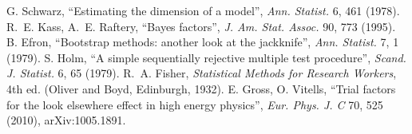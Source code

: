  G. Schwarz, ``Estimating the dimension of a model'', \emph{Ann. Statist.} 6, 461 (1978).
 R.~E. Kass, A.~E. Raftery, ``Bayes factors'', \emph{J. Am. Stat. Assoc.} 90, 773 (1995).
 B. Efron, ``Bootstrap methods: another look at the jackknife'', \emph{Ann. Statist.} 7, 1 (1979).
 S. Holm, ``A simple sequentially rejective multiple test procedure'', \emph{Scand. J. Statist.} 6, 65 (1979).
 R.~A. Fisher, \emph{Statistical Methods for Research Workers}, 4th ed. (Oliver and Boyd, Edinburgh, 1932).
 E. Gross, O. Vitells, ``Trial factors for the look elsewhere effect in high energy physics'', \emph{Eur. Phys. J.
C} 70, 525 (2010), arXiv:1005.1891.
